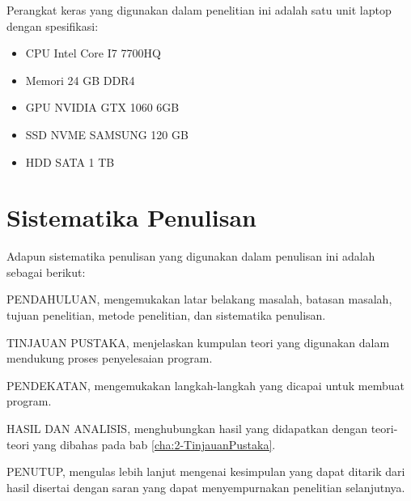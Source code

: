 Perangkat keras yang digunakan dalam penelitian ini adalah satu unit laptop dengan spesifikasi:
\begin{itemize}
  \item CPU Intel Core I7 7700HQ
  \item Memori 24 GB DDR4
  \item GPU NVIDIA GTX 1060 6GB
  \item SSD NVME SAMSUNG 120 GB
  \item HDD SATA 1 TB
\end{itemize}

\section{Sistematika Penulisan}
\label{sec:1-SistematikaPenulisan}

Adapun sistematika penulisan yang digunakan dalam penulisan ini adalah sebagai berikut:

PENDAHULUAN, mengemukakan latar belakang masalah, batasan masalah, tujuan penelitian, metode
penelitian, dan sistematika penulisan.

TINJAUAN PUSTAKA, menjelaskan kumpulan teori yang digunakan dalam mendukung proses penyelesaian
program.

PENDEKATAN, mengemukakan langkah-langkah yang dicapai untuk membuat program.

HASIL DAN ANALISIS, menghubungkan hasil yang didapatkan dengan teori-teori yang dibahas pada bab
\ref{cha:2-TinjauanPustaka}.

PENUTUP, mengulas lebih lanjut mengenai kesimpulan yang dapat ditarik dari hasil disertai dengan
saran yang dapat menyempurnakan penelitian selanjutnya.